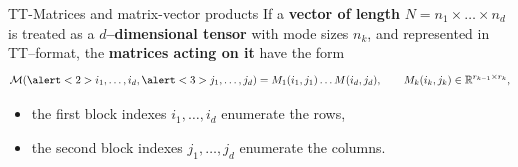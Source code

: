 \documentclass[aspectratio=169,xcolor=dvipsnames]{beamer}
\begin{document}
\begin{frame}{\faTrain\;TT-Matrices and matrix-vector products}
If a \textbf{vector of length} $N = n_1\times\ldots\times n_d$ is treated as a \textbf{$d$--dimensional tensor}
with mode sizes $n_k$, and represented in TT--format, the \alert{\textbf{matrices
acting on it}} have the form
\begin{equation*}
	\mathcal{M}(\alert<2>{i_1,\ldots,i_d},\alert<3>{j_1,\ldots,j_d}) = M_1(i_1,j_1)\ldots M(i_d,j_d), \qquad M_k(i_k,j_k) \in \mathbb{R}^{r_{k-1}\times r_k},\vspace{-1em}
\end{equation*}
\begin{itemize}
	\item[\faCogs]<2-> the first block indexes $i_1,\ldots,i_d$ enumerate the rows,
	\item[\faCogs]<3-> the second block indexes $j_1,\ldots,j_d$ enumerate the columns.
\end{itemize}


\end{frame}
\end{document}
